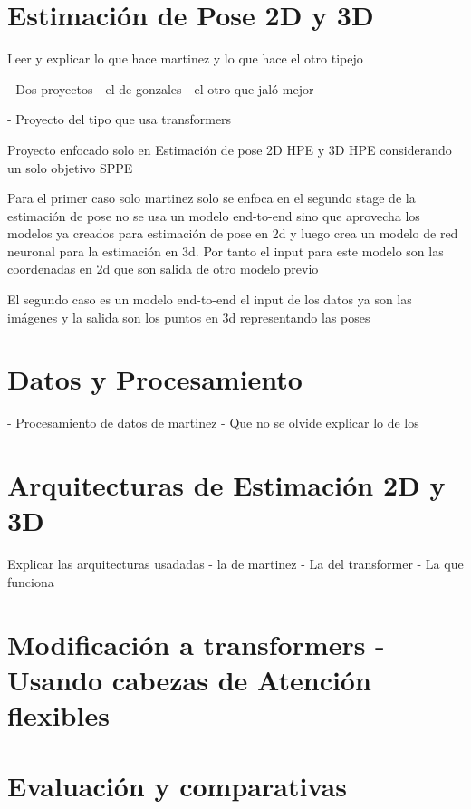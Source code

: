 \section{Estimación de Pose 2D y 3D}

Leer y explicar lo que hace martinez
y lo que hace el otro tipejo

- Dos proyectos
    - el de gonzales
    - el otro que jaló mejor

- Proyecto del tipo que usa transformers

Proyecto enfocado solo en Estimación de pose 2D HPE y 3D HPE considerando un solo objetivo SPPE

Para el primer caso solo martinez solo se enfoca en el segundo stage de la estimación de pose
no se usa un modelo end-to-end sino que aprovecha los modelos ya creados para estimación de pose
en 2d y luego crea un modelo de red neuronal para la estimación en 3d. Por tanto el input para este
modelo son las coordenadas en 2d que son salida de otro modelo previo

El segundo caso es un modelo end-to-end el input de los datos ya son las imágenes y la salida
son los puntos en 3d representando las poses


\section{Datos y Procesamiento}

- Procesamiento de datos de martinez
- Que no se olvide explicar lo de los

\section{Arquitecturas de Estimación 2D y 3D}

Explicar las arquitecturas usadadas
- la de martinez
- La del transformer
- La que funciona

\section{Modificación a transformers - Usando cabezas de Atención flexibles}

\section{Evaluación y comparativas}

